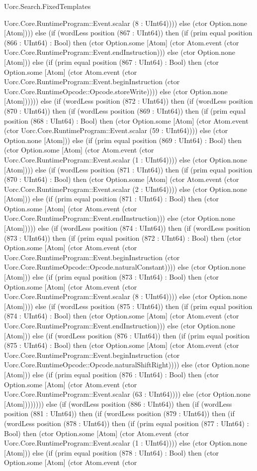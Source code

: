 \begin{lexlean}{Uorc.Search.FixedTemplates}
\begin{semanticmodule}
{Uorc.Core.RuntimeProgram::Event.scalar (8 : UInt64)))) else (ctor Option.none [Atom]))) else (if (wordLess position (867 : UInt64)) then (if (prim equal position (866 : UInt64) : Bool) then (ctor Option.some [Atom] (ctor Atom.event (ctor Uorc.Core.RuntimeProgram::Event.endInstruction))) else (ctor Option.none [Atom])) else (if (prim equal position (867 : UInt64) : Bool) then (ctor Option.some [Atom] (ctor Atom.event (ctor Uorc.Core.RuntimeProgram::Event.beginInstruction (ctor Uorc.Core.RuntimeOpcode::Opcode.storeWrite)))) else (ctor Option.none [Atom]))))) else (if (wordLess position (872 : UInt64)) then (if (wordLess position (870 : UInt64)) then (if (wordLess position (869 : UInt64)) then (if (prim equal position (868 : UInt64) : Bool) then (ctor Option.some [Atom] (ctor Atom.event (ctor Uorc.Core.RuntimeProgram::Event.scalar (59 : UInt64)))) else (ctor Option.none [Atom])) else (if (prim equal position (869 : UInt64) : Bool) then (ctor Option.some [Atom] (ctor Atom.event (ctor Uorc.Core.RuntimeProgram::Event.scalar (1 : UInt64)))) else (ctor Option.none [Atom]))) else (if (wordLess position (871 : UInt64)) then (if (prim equal position (870 : UInt64) : Bool) then (ctor Option.some [Atom] (ctor Atom.event (ctor Uorc.Core.RuntimeProgram::Event.scalar (2 : UInt64)))) else (ctor Option.none [Atom])) else (if (prim equal position (871 : UInt64) : Bool) then (ctor Option.some [Atom] (ctor Atom.event (ctor Uorc.Core.RuntimeProgram::Event.endInstruction))) else (ctor Option.none [Atom])))) else (if (wordLess position (874 : UInt64)) then (if (wordLess position (873 : UInt64)) then (if (prim equal position (872 : UInt64) : Bool) then (ctor Option.some [Atom] (ctor Atom.event (ctor Uorc.Core.RuntimeProgram::Event.beginInstruction (ctor Uorc.Core.RuntimeOpcode::Opcode.naturalConstant)))) else (ctor Option.none [Atom])) else (if (prim equal position (873 : UInt64) : Bool) then (ctor Option.some [Atom] (ctor Atom.event (ctor Uorc.Core.RuntimeProgram::Event.scalar (8 : UInt64)))) else (ctor Option.none [Atom]))) else (if (wordLess position (875 : UInt64)) then (if (prim equal position (874 : UInt64) : Bool) then (ctor Option.some [Atom] (ctor Atom.event (ctor Uorc.Core.RuntimeProgram::Event.endInstruction))) else (ctor Option.none [Atom])) else (if (wordLess position (876 : UInt64)) then (if (prim equal position (875 : UInt64) : Bool) then (ctor Option.some [Atom] (ctor Atom.event (ctor Uorc.Core.RuntimeProgram::Event.beginInstruction (ctor Uorc.Core.RuntimeOpcode::Opcode.naturalShiftRight)))) else (ctor Option.none [Atom])) else (if (prim equal position (876 : UInt64) : Bool) then (ctor Option.some [Atom] (ctor Atom.event (ctor Uorc.Core.RuntimeProgram::Event.scalar (63 : UInt64)))) else (ctor Option.none [Atom]))))))) else (if (wordLess position (886 : UInt64)) then (if (wordLess position (881 : UInt64)) then (if (wordLess position (879 : UInt64)) then (if (wordLess position (878 : UInt64)) then (if (prim equal position (877 : UInt64) : Bool) then (ctor Option.some [Atom] (ctor Atom.event (ctor Uorc.Core.RuntimeProgram::Event.scalar (1 : UInt64)))) else (ctor Option.none [Atom])) else (if (prim equal position (878 : UInt64) : Bool) then (ctor Option.some [Atom] (ctor Atom.event (ctor }
\end{semanticmodule}
\end{lexlean}
